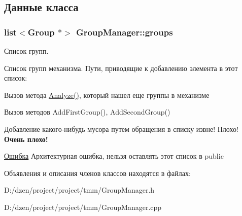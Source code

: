 \subsection{Данные класса}
\hypertarget{class_group_manager_ab8a15542235512daae8cdab78042d891}{
\subsubsection[{groups}]{\setlength{\rightskip}{0pt plus 5cm}list$<${\bf Group} $\ast$$>$ {\bf GroupManager::groups}}}
\label{class_group_manager_ab8a15542235512daae8cdab78042d891}


Список групп. 

Список групп механизма. Пути, приводящие к добавлению элемента в этот список: 
\begin{DoxyItemize}
\item Вызов метода \hyperlink{class_group_manager_abbbf104fb7ed58d2113cdffbf070f0df}{Analyze()}, который нашел еще группы в механизме 
\item Вызов методов AddFirstGroup(), AddSecondGroup() 
\item Добавление какого-\/нибудь мусора путем обращения в списку извне! Плохо! {\bfseries Очень плохо!} 
\end{DoxyItemize}\begin{Desc}
\item[\hyperlink{bug__bug000023}{Ошибка}]Архитектурная ошибка, нельзя оставлять этот список в public \end{Desc}


Объявления и описания членов классов находятся в файлах:\begin{DoxyCompactItemize}
\item 
D:/dzen/project/project/tmm/GroupManager.h\item 
D:/dzen/project/project/tmm/GroupManager.cpp\end{DoxyCompactItemize}
